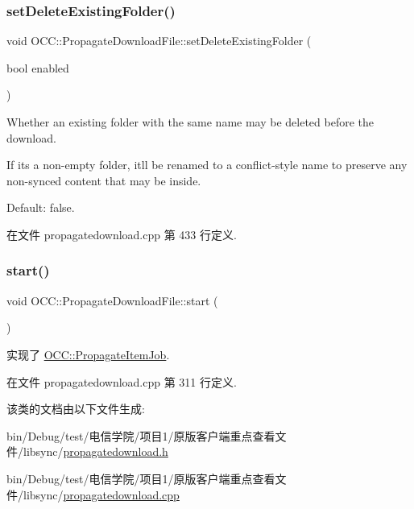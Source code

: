 \mbox{\label{class_o_c_c_1_1_propagate_download_file_aa32f9719b66c1f34e4e4aad09f27e563}} 
\subsubsection{\texorpdfstring{set\+Delete\+Existing\+Folder()}{setDeleteExistingFolder()}}
{\footnotesize\ttfamily void O\+C\+C\+::\+Propagate\+Download\+File\+::set\+Delete\+Existing\+Folder (\begin{DoxyParamCaption}\item[{bool}]{enabled }\end{DoxyParamCaption})}

Whether an existing folder with the same name may be deleted before the download.

If it\textquotesingle{}s a non-\/empty folder, it\textquotesingle{}ll be renamed to a conflict-\/style name to preserve any non-\/synced content that may be inside.

Default\+: false. 

在文件 propagatedownload.\+cpp 第 433 行定义.

\mbox{\label{class_o_c_c_1_1_propagate_download_file_ade2a2624bf1c87f82d032d1d60790352}} 
\subsubsection{\texorpdfstring{start()}{start()}}
{\footnotesize\ttfamily void O\+C\+C\+::\+Propagate\+Download\+File\+::start (\begin{DoxyParamCaption}{ }\end{DoxyParamCaption})\hspace{0.3cm}{\ttfamily [virtual]}}



实现了 \hyperlink{class_o_c_c_1_1_propagate_item_job_a97e7a37e51ad1696f6590dd52080f10a}{O\+C\+C\+::\+Propagate\+Item\+Job}.



在文件 propagatedownload.\+cpp 第 311 行定义.



该类的文档由以下文件生成\+:\begin{DoxyCompactItemize}
\item 
bin/\+Debug/test/电信学院/项目1/原版客户端重点查看文件/libsync/\hyperlink{propagatedownload_8h}{propagatedownload.\+h}\item 
bin/\+Debug/test/电信学院/项目1/原版客户端重点查看文件/libsync/\hyperlink{propagatedownload_8cpp}{propagatedownload.\+cpp}\end{DoxyCompactItemize}
